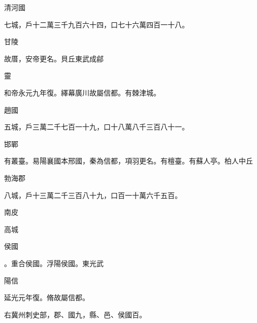 \begin{pinyinscope}
清河國

七城，戶十二萬三千九百六十四，口七十六萬四百一十八。

甘陵

故厝，安帝更名。貝丘東武成鄃

靈

和帝永元九年復。繹幕廣川故屬信都。有棘津城。

趙國

五城，戶三萬二千七百一十九，口十八萬八千三百八十一。

邯鄲

有叢臺。易陽襄國本邢國，秦為信都，項羽更名。有檀臺。有蘇人亭。柏人中丘

勃海郡

八城，戶十三萬二千三百八十九，口百一十萬六千五百。

南皮

高城

侯國

。重合侯國。浮陽侯國。東光武

陽信

延光元年復。脩故屬信都。

右冀州刺史部，郡、國九，縣、邑、侯國百。


\end{pinyinscope}